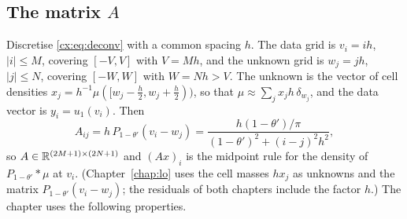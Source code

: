 \subsection{The matrix $A$}

Discretise \eqref{cx:eq:deconv} with a common spacing $h$. The data grid is $v_i=ih$, $|i|\le M$, covering $[-V,V]$ with $V=Mh$, and the unknown grid is $w_j=jh$, $|j|\le N$, covering $[-W,W]$ with $W=Nh>V$. The unknown is the vector of cell densities $x_j=h^{-1}\mu([w_j-\tfrac h2,w_j+\tfrac h2))$, so that $\mu\approx\sum_jx_jh\,\delta_{w_j}$, and the data vector is $y_i=u_1(v_i)$. Then
\begin{equation}\label{cx:eq:Amatrix}
A_{ij}=h\,P_{1-\theta'}(v_i-w_j)=\frac{h(1-\theta')/\pi}{(1-\theta')^2+(i-j)^2h^2},
\end{equation}
so $A\in\mathbb{R}^{(2M+1)\times(2N+1)}$ and $(Ax)_i$ is the midpoint rule for the density of $P_{1-\theta'}*\mu$ at $v_i$. (Chapter~\ref{chap:lo} uses the cell masses $hx_j$ as unknowns and the matrix $P_{1-\theta'}(v_i-w_j)$; the residuals of both chapters include the factor $h$.) The chapter uses the following properties.

